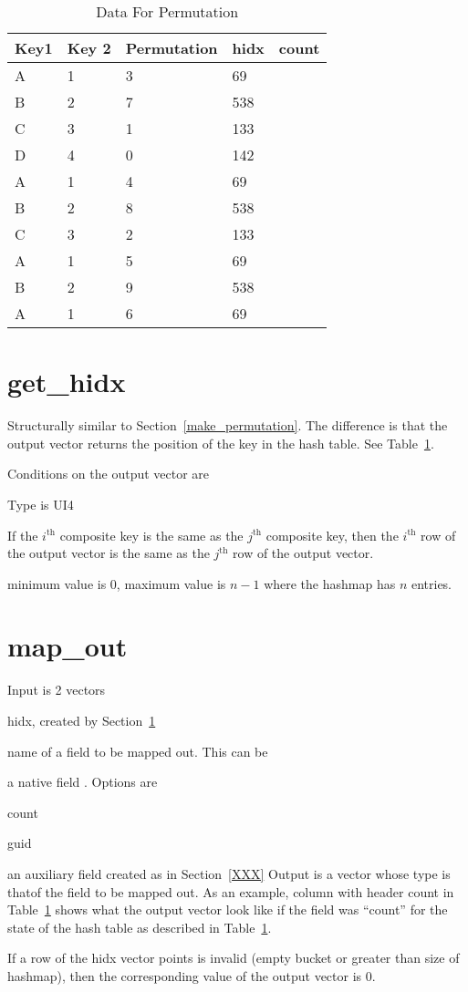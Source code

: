\begin{table}
\centering
\begin{tabular}{|l|l||l|l|l|} \hline \hline 
{\bf Key1 } & {\bf Key 2} & {\bf Permutation} & {\bf hidx} 
& {\bf count} \\ \hline \hline
A & 1 & 3 & 69 \\ \hline
B & 2 & 7 & 538 \\ \hline
C & 3 & 1 & 133 \\ \hline
D & 4 & 0 & 142 \\ \hline
A & 1 & 4 & 69 \\ \hline
B & 2 & 8 & 538 \\ \hline
C & 3 & 2 & 133 \\ \hline
A & 1 & 5 & 69 \\ \hline
B & 2 & 9 & 538 \\ \hline
A & 1 & 6 & 69 \\ \hline
\hline
\end{tabular}
\caption{Data For Permutation}
\label{data_1}
\end{table}

\section{get\_hidx}
\label{get_hidx}

Structurally similar to Section~\ref{make_permutation}. The difference is that
the output vector returns the position of the key in the hash table. See
Table~\ref{data_1}.

Conditions on the output vector are 
\be
\item Type is UI4
\item If the \(i^{\mathrm{th}}\) composite key is the same as the 
\(j^{\mathrm{th}}\) composite key, then the 
\(i^{\mathrm{th}}\) row of the output vector is the same as the 
\(j^{\mathrm{th}}\)  row of the output vector.
\item minimum value is 0, maximum value is \(n-1\) where the hashmap has \(n\)
entries.
\ee

\section{map\_out}
\label{map_out}
Input is 2 vectors
\be
\item hidx, created by Section~\ref{get_hidx}
\item name of a field to be mapped out. This can be 
\be
\item a native field . Options are 
\be
\item count
\item guid
\ee
\item an auxiliary field created as in Section~\ref{XXX}
\ee
Output is a vector whose type is thatof the field to be mapped out.
As an example, column with header {\bc count} in Table~\ref{data_1} 
shows what the output vector look like if the field was ``count'' for the state
of the hash table as described in Table~\ref{data_1}.

If a row of the hidx vector points is invalid (empty bucket or greater than size
of hashmap), then the corresponding value of the output vector is 0.

